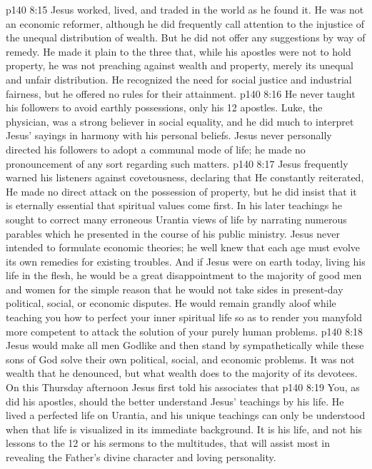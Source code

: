 \vs p140 8:15 \bibnobreakspace {} Jesus worked, lived, and traded in the world as he found it. He was not an economic reformer, although he did frequently call attention to the injustice of the unequal distribution of wealth. But he did not offer any suggestions by way of remedy. He made it plain to the three that, while his apostles were not to hold property, he was not preaching against wealth and property, merely its unequal and unfair distribution. He recognized the need for social justice and industrial fairness, but he offered no rules for their attainment.
\vs p140 8:16 He never taught his followers to avoid earthly possessions, only his 12 apostles. Luke, the physician, was a strong believer in social equality, and he did much to interpret Jesus’ sayings in harmony with his personal beliefs. Jesus never personally directed his followers to adopt a communal mode of life; he made no pronouncement of any sort regarding such matters.
\vs p140 8:17 Jesus frequently warned his listeners against covetousness, declaring that  He constantly reiterated,  He made no direct attack on the possession of property, but he did insist that it is eternally essential that spiritual values come first. In his later teachings he sought to correct many erroneous Urantia views of life by narrating numerous parables which he presented in the course of his public ministry. Jesus never intended to formulate economic theories; he well knew that each age must evolve its own remedies for existing troubles. And if Jesus were on earth today, living his life in the flesh, he would be a great disappointment to the majority of good men and women for the simple reason that he would not take sides in present\hyp{}day political, social, or economic disputes. He would remain grandly aloof while teaching you how to perfect your inner spiritual life so as to render you manyfold more competent to attack the solution of your purely human problems.
\vs p140 8:18 \pc Jesus would make all men Godlike and then stand by sympathetically while these sons of God solve their own political, social, and economic problems. It was not wealth that he denounced, but what wealth does to the majority of its devotees. On this Thursday afternoon Jesus first told his associates that 
\vs p140 8:19 \bibnobreakspace {} You, as did his apostles, should the better understand Jesus’ teachings by his life. He lived a perfected life on Urantia, and his unique teachings can only be understood when that life is visualized in its immediate background. It is his life, and not his lessons to the 12 or his sermons to the multitudes, that will assist most in revealing the Father’s divine character and loving personality.
